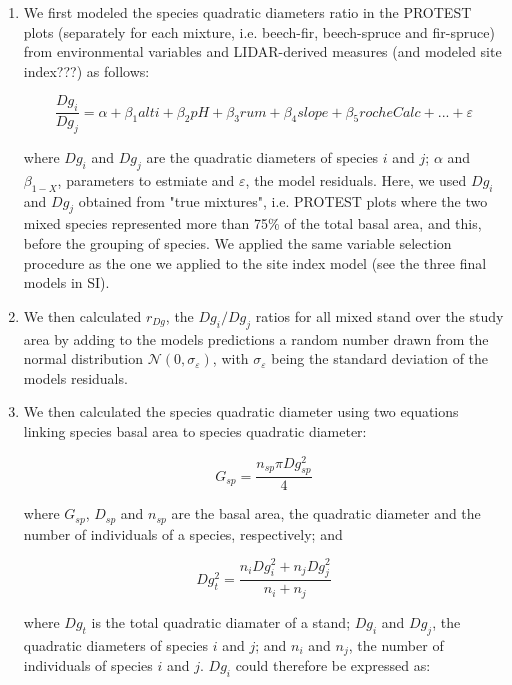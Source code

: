 \documentclass[a4paper]{article}
\begin{document}
\begin{enumerate}

  \item We first modeled the species quadratic diameters ratio in the PROTEST plots (separately for each mixture, i.e. beech-fir, beech-spruce and fir-spruce) from environmental variables and LIDAR-derived measures (and modeled site index???) as follows:

  \begin{equation}\label{DgModel}
    \frac{Dg_i}{Dg_j} = \alpha + \beta_1 alti + \beta_2 pH +\beta_3 rum +\beta_4 slope +\beta_5 rocheCalc+...+\varepsilon
  \end{equation}

  where $Dg_i$ and $Dg_j$ are the quadratic diameters of species $i$ and $j$; $\alpha$ and $\beta_{1-X}$, parameters to estmiate and $\varepsilon$, the model residuals. Here, we used $Dg_i$ and $Dg_j$ obtained from "true mixtures", i.e. PROTEST plots where the two mixed species represented more than 75\% of the total basal area, and this, before the grouping of species. We applied the same variable selection procedure as the one we applied to the site index model (see the three final models in SI).

  \item We then calculated $r_{Dg}$, the $Dg_i / Dg_j$ ratios for all mixed stand over the study area by adding to the models predictions a random number drawn from the normal distribution $\mathcal{N} (0, \sigma_\varepsilon)$, with $\sigma_\varepsilon$ being the standard deviation of the models residuals.

  \item We then calculated the species quadratic diameter using two equations linking species basal area to species quadratic diameter:

  \begin{equation}\label{}
    G_{sp} = \frac{n_{sp}\pi Dg_{sp}^2}{4}
  \end{equation}

  where $G_{sp}$, $D_{sp}$ and $n_{sp}$ are the basal area, the quadratic diameter and the number of individuals of a species, respectively; and

  \begin{equation}\label{}
    Dg_t^2 = \frac{n_iDg_i^2 + n_jDg_j^2}{n_i + n_j}
  \end{equation}

  where $Dg_t$ is the total quadratic diamater of a stand; $Dg_i$ and $Dg_j$, the quadratic diameters of species $i$ and $j$; and $n_i$ and $n_j$, the number of individuals of species $i$ and $j$. $Dg_i$ could therefore be expressed as:


\end{enumerate}
\end{document}
